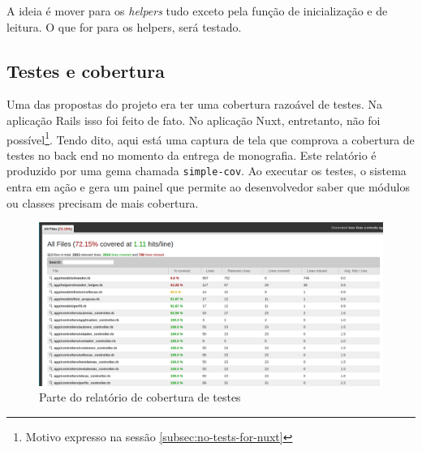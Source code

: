 A ideia é mover para os \emph{helpers} tudo exceto pela função de inicialização e de leitura. O que for para os helpers,
será testado.

\subsection{Testes e cobertura}
\label{subsec:testes-cobertura}

Uma das propostas do projeto era ter uma cobertura razoável de testes. Na aplicação Rails isso foi feito de fato. No
aplicação Nuxt, entretanto, não foi possível\footnote{Motivo expresso na sessão \ref{subsec:no-tests-for-nuxt}}. Tendo
dito, aqui está uma captura de tela que comprova a cobertura de testes no back end no momento da entrega de monografia. Este
relatório é produzido por uma gema chamada \texttt{simple-cov}. Ao executar os testes, o sistema entra em ação e gera um
painel que permite ao desenvolvedor saber que módulos ou classes precisam de mais cobertura.

\begin{figure}[htb]
  \centering
  \includegraphics[width=.9\textwidth]{figuras/test_coverage.png}
  \caption{Parte do relatório de cobertura de testes}
  \label{fig:test-coverage}
\end{figure}
